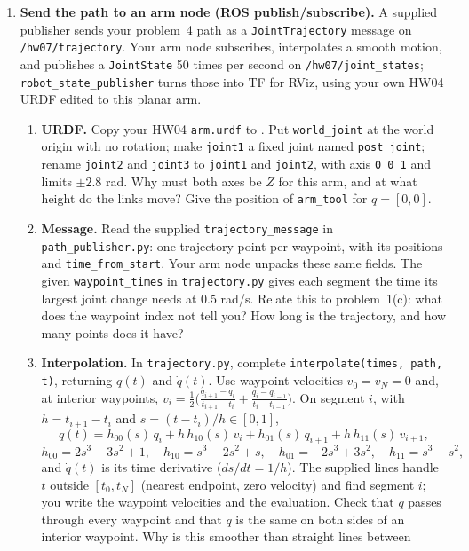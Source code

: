 \begin{enumerate}[start=3]
\item \textbf{Send the path to an arm node (ROS publish/subscribe).}
A supplied publisher sends your problem~4 path as a
\texttt{JointTrajectory} message on \texttt{/hw07/trajectory}. Your arm node
subscribes, interpolates a smooth motion, and publishes a
\texttt{JointState} 50 times per second on \texttt{/hw07/joint\_states};
\texttt{robot\_state\_publisher} turns those into TF for RViz, using your own
HW04 URDF edited to this planar arm.
\begin{enumerate}
\item \textbf{URDF.} Copy your HW04 \texttt{arm.urdf} to
. Put \texttt{world\_joint} at the world
origin with no rotation; make \texttt{joint1} a fixed joint named
\texttt{post\_joint}; rename \texttt{joint2} and \texttt{joint3} to
\texttt{joint1} and \texttt{joint2}, with axis \mbox{\texttt{0 0 1}} and
limits $\pm2.8$ rad. Why must both axes be $Z$ for this arm, and at what height do
the links move? Give the position of \texttt{arm\_tool} for $q=[0,0]$.
\item \textbf{Message.} Read the supplied \texttt{trajectory\_\allowbreak message} in
\texttt{path\_publisher.py}: one trajectory point per waypoint, with its
positions and \texttt{time\_\allowbreak from\_\allowbreak start}. Your arm node
unpacks these same fields. The given
\texttt{waypoint\_\allowbreak times} in \texttt{trajectory.py} gives each
segment the time its largest joint change needs at $0.5$ rad/s. Relate this
to problem~1(c): what does the waypoint index not tell you? How long is the
trajectory, and how many points does it have?
\item \textbf{Interpolation.} In \texttt{trajectory.py}, complete
\texttt{interpolate(times, path, t)}, returning $q(t)$ and $\dot q(t)$. Use
waypoint velocities $v_0=v_N=0$ and, at interior waypoints,
$v_i=\tfrac12\big(\tfrac{q_{i+1}-q_i}{t_{i+1}-t_i}+\tfrac{q_i-q_{i-1}}{t_i-t_{i-1}}\big)$.
On segment $i$, with $h=t_{i+1}-t_i$ and $s=(t-t_i)/h\in[0,1]$,
\[
q(t)=h_{00}(s)\,q_i+h\,h_{10}(s)\,v_i+h_{01}(s)\,q_{i+1}+h\,h_{11}(s)\,v_{i+1},
\]
\[
h_{00}=2s^3-3s^2+1,\quad h_{10}=s^3-2s^2+s,\quad h_{01}=-2s^3+3s^2,\quad h_{11}=s^3-s^2,
\]
and $\dot q(t)$ is its time derivative ($ds/dt=1/h$). The supplied lines
handle $t$ outside $[t_0,t_N]$ (nearest endpoint, zero velocity) and find
segment $i$; you write the waypoint velocities and the evaluation. Check that $q$
passes through every waypoint and that $\dot q$ is the same on both sides of
an interior waypoint. Why is this smoother than straight lines between

\end{enumerate}
\end{enumerate}

